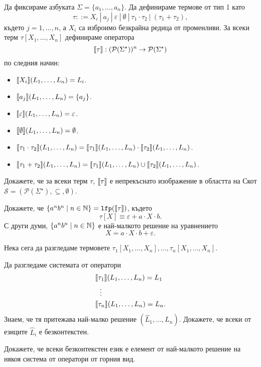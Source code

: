 Да фиксираме азбуката $\Sigma = \{a_1,\dots,a_n\}$.
Да дефинираме термове от тип 1 като
\[\tau ::= X_i\ |\ a_j\ |\ \varepsilon\ |\ \emptyset\ |\ \tau_1 \cdot \tau_2\ |\ (\tau_1 + \tau_2),\]
където $j = 1, \dots,n$, а $X_i$ са изброимо безкрайна редица от променливи.
За всеки терм $\tau[X_1,\dots,X_n]$ дефинираме оператора 
\[\llbracket{\tau}\rrbracket: (\mathcal{P}(\Sigma^\star))^n \to \mathcal{P}(\Sigma^\star)\]
 по следния начин:
\begin{itemize}
\item 
  $\llbracket{X_i}\rrbracket(L_1,\dots,L_n) = L_i$.
\item 
  $\llbracket{a_j}\rrbracket(L_1,\dots,L_n) = \{a_j\}$.
\item 
  $\llbracket{\varepsilon}\rrbracket(L_1,\dots,L_n) = \varepsilon$.
\item 
  $\llbracket{\emptyset}\rrbracket(L_1,\dots,L_n) = \emptyset$.
\item 
  $\llbracket{\tau_1 \cdot \tau_2}\rrbracket(L_1,\dots,L_n) = \llbracket{\tau_1}\rrbracket(L_1,\dots,L_n) \cdot \llbracket{\tau_2}\rrbracket(L_1,\dots,L_n)$.
\item
  $\llbracket{\tau_1 + \tau_2}\rrbracket(L_1,\dots,L_n) = \llbracket{\tau_1}\rrbracket(L_1,\dots,L_n) \cup \llbracket{\tau_2}\rrbracket(L_1,\dots,L_n)$.
\end{itemize}

\begin{problem}
  Докажете, че за всеки терм $\tau$, $\llbracket{\tau}\rrbracket$ е непрекъснато изображение в областта на Скот
  $\mathcal{S} = ( \mathcal{P}(\Sigma^\star),\subseteq, \emptyset)$.
\end{problem}

\begin{problem}
  Докажете, че $\{a^nb^n \mid n\in \mathbb{N}\} = \texttt{lfp}(\llbracket{\tau}\rrbracket)$, където 
  \[\tau[X] \equiv \varepsilon + a \cdot X \cdot b.\]
  С други думи, $\{a^nb^n \mid n \in \mathbb{N}\}$ е най-малкото решение на уравнението
  \[X = a \cdot X \cdot b + \varepsilon.\]
\end{problem}

Нека сега да разгледаме термовете $\tau_1[X_1,\dots,X_n], \dots, \tau_n[X_1,\dots,X_n]$.

\begin{problem}
  Да разгледаме системата от оператори
  \begin{align*}
    & \llbracket{\tau_1}\rrbracket(L_1,\dots,L_n) = L_1\\
    & \ \ \vdots\\
    & \llbracket{\tau_n}\rrbracket(L_1,\dots,L_n) = L_n.
  \end{align*}
  Знаем, че тя притежава най-малко решение $(\hat{L}_1,\dots,\hat{L}_n)$.
  Докажете, че всеки от езиците $\hat{L}_i$ е безконтекстен.

  Докажете, че всеки безконтекстен език е елемент от най-малкото решение 
  на някоя система от оператори от горния вид.
\end{problem}

